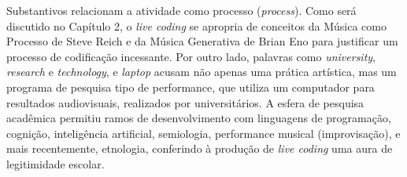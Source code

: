 Substantivos relacionam a atividade como processo (\emph{process}). Como será discutido no Capítulo 2, o \emph{live coding} se apropria de conceitos da Música como Processo de Steve Reich e da Música Generativa de Brian Eno para justificar um processo de codificação incessante. Por outro lado, palavras como \emph{university}, \emph{research} e \emph{technology}, e \emph{laptop} acusam não apenas uma prática artística, mas um programa de pesquisa tipo de performance, que utiliza um computador para resultados audiovisuais, realizados por universitários. A esfera de pesquisa acadêmica permitiu ramos de desenvolvimento com linguagens de programação, cognição, inteligência artificial, semiologia, performance musical (improvisação), e mais recentemente, etnologia, conferindo à produção de \emph{live coding} uma aura de legitimidade escolar.